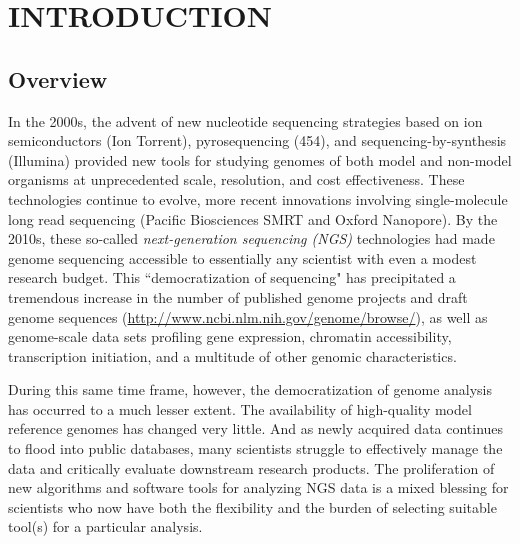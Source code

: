 \chapter{INTRODUCTION}

\section{Overview}

In the 2000s, the advent of new nucleotide sequencing strategies based on ion semiconductors (Ion Torrent), pyrosequencing (454), and sequencing-by-synthesis (Illumina) provided new tools for studying genomes of both model and non-model organisms at unprecedented scale, resolution, and cost effectiveness.
These technologies continue to evolve, more recent innovations involving single-molecule long read sequencing (Pacific Biosciences SMRT and Oxford Nanopore).
By the 2010s, these so-called \textit{next-generation sequencing (NGS)} technologies had made genome sequencing accessible to essentially any scientist with even a modest research budget.
This ``democratization of sequencing" has precipitated a tremendous increase in the number of published genome projects and draft genome sequences (\url{http://www.ncbi.nlm.nih.gov/genome/browse/}), as well as genome-scale data sets profiling gene expression, chromatin accessibility, transcription initiation, and a multitude of other genomic characteristics.

During this same time frame, however, the democratization of genome analysis has occurred to a much lesser extent.
The availability of high-quality model reference genomes has changed very little.
And as newly acquired data continues to flood into public databases, many scientists struggle to effectively manage the data and critically evaluate downstream research products.
The proliferation of new algorithms and software tools for analyzing NGS data is a mixed blessing for scientists who now have both the flexibility and the burden of selecting suitable tool(s) for a particular analysis.

